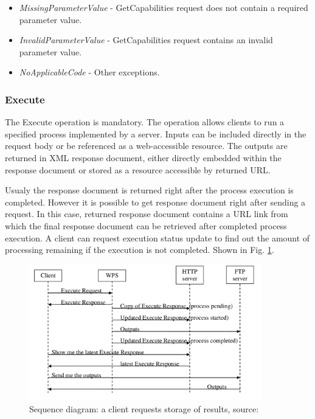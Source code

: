 \documentclass[12pt,a4paper]{article}
\begin{document}
\begin{itemize}
\item\textit{MissingParameterValue} - GetCapabilities request does not contain a required parameter value.
\item\textit{InvalidParameterValue} - GetCapabilities request contains an invalid parameter value.
\item\textit{NoApplicableCode} - Other exceptions.
\end{itemize}

\bigskip
\subsubsection{Execute}
The Execute operation is mandatory. The operation allows clients to run a specified process implemented by a server.
Inputs can be included directly in the request body or be referenced as a web-accessible resource. The outputs are returned
in XML response document, either directly embedded within the response document or stored as a resource accessible by
returned URL.

Usualy the response document is returned right after the process execution is completed. However it is possible to get
response document right after sending a request. In this case, returned response document contains a URL link from which the
final response document can be retrieved after completed process execution. A client can request execution status update to
find out the amount of processing remaining if the execution is not completed. Shown in Fig. \ref{fig:WPS_sequence}.

\begin{figure}[h!]
\centering
\includegraphics[width=0.9\textwidth]{img/WPS_sequence.png}
\caption{Sequence diagram: a client requests storage of results, source: \cite{WPS_standart_1.0}}
\label{fig:WPS_sequence}
\end{figure}
\end{document}
